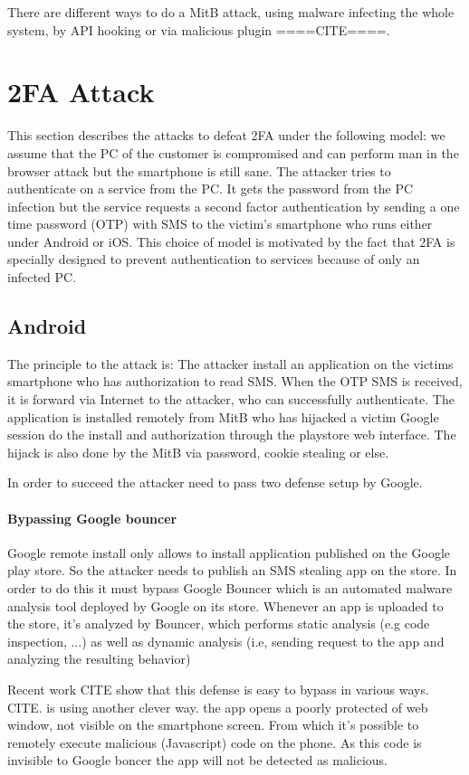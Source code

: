 \documentclass[11pt, a4paper,twocolumn]{article}
\begin{document}
There are different ways to do a MitB attack, using malware infecting the whole system, by API hooking or via malicious plugin ====CITE====.


\section{2FA Attack}
 This section describes the attacks to defeat 2FA under the following model: we assume that the PC of the customer is compromised and can perform man in the browser attack but the smartphone is still sane. The attacker tries to authenticate on a service from the PC. It gets the password from the PC infection but the service requests a second factor authentication by sending a one time password (OTP) with SMS to the victim's smartphone who runs either under Android or iOS. 
This choice of model is motivated by the fact that 2FA is specially designed to prevent authentication to services because of only an infected PC.
\subsection{Android}
The principle to the attack is: The attacker install an application on the victims smartphone who has authorization to read SMS. When the OTP SMS is received, it is forward via Internet to the attacker, who can successfully authenticate. The application is installed remotely from MitB who has hijacked a victim Google session do the install and authorization through the playstore web interface. The hijack is also done by the MitB via password, cookie stealing or else.

In order to succeed the attacker need to pass two defense setup by Google.

\paragraph{Bypassing Google bouncer} Google remote install only allows to install application published on the Google play store. So the attacker needs to publish an SMS stealing app on the store. In order to do this it must bypass Google Bouncer which is an automated malware analysis tool deployed by Google on its store. Whenever an app is uploaded to the store, it's analyzed by Bouncer, which performs static analysis (e.g code inspection, ...) as well as dynamic analysis (i.e, sending request to the app and analyzing the resulting behavior)

Recent work CITE show that this defense is easy to bypass in various ways. CITE. \cite{Base} is using another clever way. the app opens a poorly protected of web window, not visible on the smartphone screen. From which it's possible to remotely execute malicious (Javascript) code on the phone. As this code is invisible to Google boncer the app will not be detected as malicious.
\end{document}
